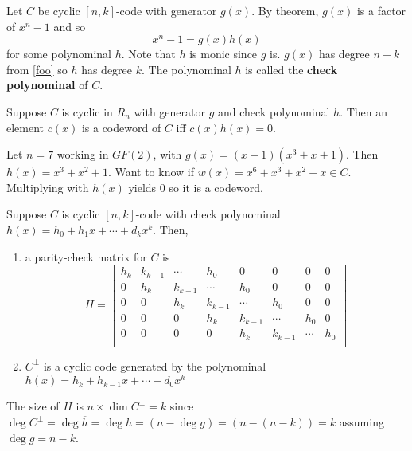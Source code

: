 \documentclass{article}
\begin{document}
\begin{definition}
  Let \( C \) be cyclic \( [n, k] \)-code with generator \( g(x) \).
  By theorem, \( g(x) \) is a factor of \( x^n-1 \) and so \[
    x^n-1= g(x)h(x)
  \] for some polynominal \( h \). Note that \( h  \) is monic since
  \( g  \) is. \( g(x) \) has degree \( n-k  \) from \autoref{foo} so
  \( h  \) has degree \( k \). The polynominal \( h  \) is called the
  \textbf{check polynominal} of \( C \).
\end{definition}
\begin{theorem}
  Suppose \( C \) is cyclic in \( R_n  \) with generator \( g  \) and
  check polynominal \( h \). Then an element \( c(x)  \) is a
  codeword of \( C \) iff \( c(x)h(x) = 0 \).
\end{theorem}
\begin{example}
  Let \( n = 7 \) working in \( GF(2) \), with \( g(x) =  (x-1)(x^3+x+1)\). Then \( h(x) = x^3+x^2+1 \). Want to know if \( w(x) = x^6+x^3+x^2+x \in C \). Multiplying with \( h(x) \) yields \( 0 \) so it is a codeword.
\end{example}
\begin{theorem}
  Suppose \( C  \) is cyclic \( [n, k] \)-code with check polynominal
  \( h(x) = h_0 + h_1x + \cdots + d_kx^k \). Then,
  \begin{enumerate}
    \item a parity-check matrix for \( C  \) is \[
            H =
            \begin{bmatrix}
              h_k & k_{k-1} & \cdots  & h_0     & 0       & 0       & 0      & 0   \\
              0   & h_k     & k_{k-1} & \cdots  & h_0     & 0       & 0      & 0   \\
              0   & 0       & h_k     & k_{k-1} & \cdots  & h_0     & 0      & 0   \\
              0   & 0       & 0       & h_k     & k_{k-1} & \cdots  & h_0    & 0   \\
              0   & 0       & 0       & 0       & h_k     & k_{k-1} & \cdots & h_0 \\
            \end{bmatrix}
          \]
    \item \( C^\perp \) is a cyclic code generated by the polynominal \(
          \overline{h}(x) = h_k + h_{k-1}x + \cdots + d_0x^k   \)
  \end{enumerate}

  The size of \( H \) is \( n \times \dim C^\perp = k\) since \( \deg C^\perp = \deg \overline{h} = \deg h = (n -\deg g) = (n - (n - k)) = k\) assuming \( \deg g = n - k \).
\end{theorem}
\end{document}
